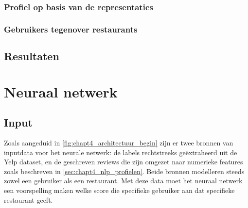 \subsubsection{Profiel op basis van de representaties}


\subsubsection{Gebruikers tegenover restaurants}


\subsection{Resultaten}
\label{sub:chapt4_nlp_resultaten}



\section{Neuraal netwerk}
\label{sec:chapt4_neuraal_netwerk}

\subsection{Input}
Zoals aangeduid in \autoref{fig:chapt4_architectuur_begin} zijn er twee bronnen van inputdata voor het neurale netwerk: de labels rechtstreeks geëxtraheerd uit de Yelp dataset, en de geschreven reviews die zijn omgezet naar numerieke features zoals beschreven in \autoref{sec:chapt4_nlp_profielen}. Beide bronnen modelleren steeds zowel een gebruiker als een restaurant. Met deze data moet het neuraal netwerk een voorspelling maken welke score die specifieke gebruiker aan dat specifieke restaurant geeft.

